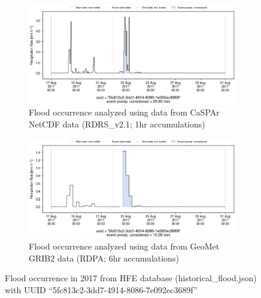 \documentclass[10pt,a4paper,titlepage,parskip]{scrartcl}
\begin{document}
\begin{figure}[h]
	\begin{subfigure}[a]{1.0\textwidth}
		\centering
		\includegraphics[width=\linewidth]{figures/compare_Geomet_CaSPAr/interpolated_at_stations_occurrence_794_identified-timesteps_RDRS_v2.1.png}
		\caption{Flood occurrence analyzed using data from CaSPAr NetCDF data (RDRS\_v2.1; 1hr accumulations)}
	\end{subfigure}
	\par\bigskip\bigskip
	\begin{subfigure}[b]{1.0\textwidth}
		\centering
		\includegraphics[width=\linewidth]{figures/compare_Geomet_CaSPAr/interpolated_at_stations_occurrence_794_identified-timesteps_rdpa_10km_6f.png}
		\caption{Flood occurrence analyzed using data from GeoMet GRIB2 data (RDPA; 6hr accumulations)}
	\end{subfigure}
	\par\bigskip\bigskip
	\caption{Flood occurrence in 2017 from HFE database (historical\_flood.json) with UUID ``5fc813c2-3dd7-4914-8086-7e092ec3689f''}
\end{figure}
\pagebreak
\end{document}
